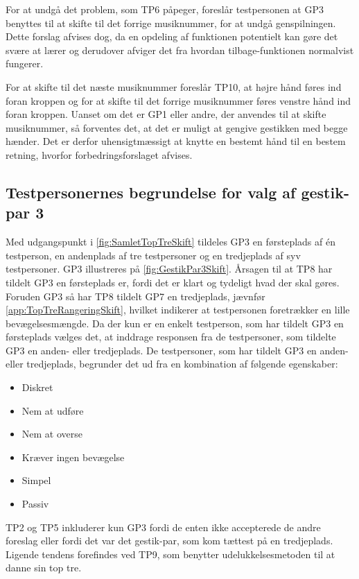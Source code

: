 For at undgå det problem, som TP6 påpeger, foreslår testpersonen at GP3 benyttes til at skifte til det forrige musiknummer, for at undgå genspilningen. Dette forslag afvises dog, da en opdeling af funktionen potentielt kan gøre det svære at lærer og derudover afviger det fra hvordan tilbage-funktionen normalvist fungerer. 

For at skifte til det næste musiknummer foreslår TP10, at højre hånd føres ind foran kroppen og for at skifte til det forrige musiknummer føres venstre hånd ind foran kroppen. Uanset om det er GP1 eller andre, der anvendes til at skifte musiknummer, så forventes det, at det er muligt at gengive gestikken med begge hænder. Det er derfor uhensigtmæssigt at knytte en bestemt hånd til en bestem retning, hvorfor forbedringsforslaget afvises.     
%
\subsection{Testpersonernes begrundelse for valg af gestik-par 3}
\label{TestresultaterValgAfGestikkerBegrundelseGP3Skift}
% 
Med udgangspunkt i \autoref{fig:SamletTopTreSkift} tildeles GP3 en førsteplads af én testperson, en andenplads af tre testpersoner og en tredjeplads af syv testpersoner. GP3 illustreres på \autoref{fig:GestikPar3Skift}. Årsagen til at TP8 har tildelt GP3 en førsteplads er, fordi det er klart og tydeligt hvad der skal gøres. Foruden GP3 så har TP8 tildelt GP7 en tredjeplads, jævnfør \autoref{app:TopTreRangeringSkift}, hvilket indikerer at testpersonen foretrækker en lille bevægelsesmængde. Da der kun er en enkelt testperson, som har tildelt GP3 en førsteplads vælges det, at inddrage responsen fra de testpersoner, som tildelte GP3 en anden- eller tredjeplads. De testpersoner, som har tildelt GP3 en anden- eller tredjeplads, begrunder det ud fra en kombination af følgende egenskaber: 
%
\begin{multicols}{3}
    \begin{itemize}
        \item Diskret
        \item Nem at udføre
        \item Nem at overse
        \item Kræver ingen bevægelse
        \item Simpel
        \item Passiv
\end{itemize}
\end{multicols}
\noindent
%
TP2 og TP5 inkluderer kun GP3 fordi de enten ikke accepterede de andre foreslag eller fordi det var det gestik-par, som kom tættest på en tredjeplads. Ligende tendens forefindes ved TP9, som benytter udelukkelsesmetoden til at danne sin top tre.
